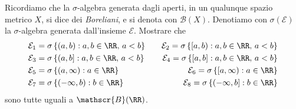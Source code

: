 \documentclass[11pt]{scrartcl}
\begin{document}
	\begin{exercise}
		Ricordiamo che la $\sigma$-algebra generata dagli aperti, in un qualunque spazio metrico $X$, si dice dei \textit{Boreliani}, e si denota con $\mathscr{B}(X)$. Denotiamo con $\sigma(\mathcal{E})$ la $\sigma$-algebra generata dall'insieme $\mathcal{E}$. Mostrare che 
		\begin{align*}
			&\mathcal{E}_1= \sigma\left\{(a,b):a,b\in \RR,\,a<b\right\} \quad  &\mathcal{E}_2= \sigma\left\{[a,b):a,b\in \RR,\,a<b\right\} \\
			&\mathcal{E}_3= \sigma\left\{(a,b]:a,b\in \RR,\,a<b\right\}  \quad  &\mathcal{E}_4= \sigma\left\{[a,b]:a,b\in \RR,\,a<b\right\} \\
			&\mathcal{E}_5= \sigma\left\{(a,\infty):a\in \RR\right\}  \quad  
			&\mathcal{E}_6= \sigma\left\{[a,\infty):a\in \RR\right\} \\
			&\mathcal{E}_7= \sigma\left\{(-\infty,b):b\in \RR\right\}  \quad 
			&\mathcal{E}_8= \sigma\left\{(-\infty,b]:b\in \RR\right\} \\
		\end{align*}
		sono tutte uguali a $\mathscr{B}(\RR)$.
	\end{exercise}
\end{document}
